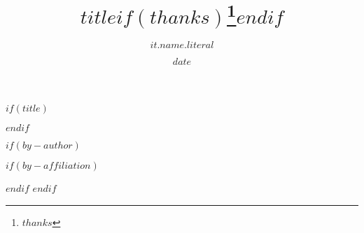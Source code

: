 $if(title)$
\title{$title$$if(thanks)$\thanks{$thanks$}$endif$}
$endif$



$if(by-author)$

\author{$it.name.literal$}


$if(by-affiliation)$

$endif$
$endif$


\date{$date$}
